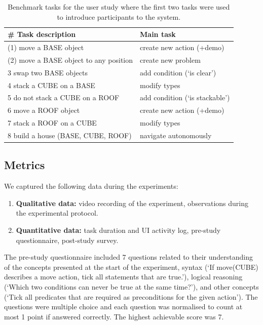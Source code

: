 \begin{table}[h]
	\centering
	\caption{Benchmark tasks for the user study where the first two tasks were used to introduce participants to the system.}
	\label{table:userstudytasks}
	\begin{center}
		\begin{tabular}{ll}
			\# Task description & Main task \\ \hline
			(1) move a BASE object & create new action (+demo) \\
			(2) move a BASE object to any position & create new problem \\
			3 swap two BASE objects & add condition (`is clear') \\
			4 stack a CUBE on a BASE & modify types\\
			5 do not stack a CUBE on a ROOF & add condition (`is stackable')\\
			6 move a ROOF object & create new action (+demo) \\
			7 stack a ROOF on a CUBE & modify types  \\
			8 build a house (BASE, CUBE, ROOF) & navigate autonomously \\ \hline
		\end{tabular}
	\end{center}
\end{table}

\subsection{Metrics}
We captured the following data during the experiments:
\begin{enumerate}
    \item \textbf{Qualitative data:} video recording of the experiment, observations during the experimental protocol.
    \item \textbf{Quantitative data:} task duration and UI activity log, pre-study questionnaire, post-study survey.
\end{enumerate}

The pre-study questionnaire included 7 questions related to their understanding of the concepts presented at the start of the experiment, \eg syntax (`If move(CUBE) describes a move action, tick all statements that are true.'), logical reasoning 
(`Which two conditions can never be true at the same time?'), and other concepts (`Tick all predicates that are required as preconditions for the given action').
The questions were multiple choice and each question was normalised to count at most 1 point if answered correctly.
The highest achievable score was 7.

